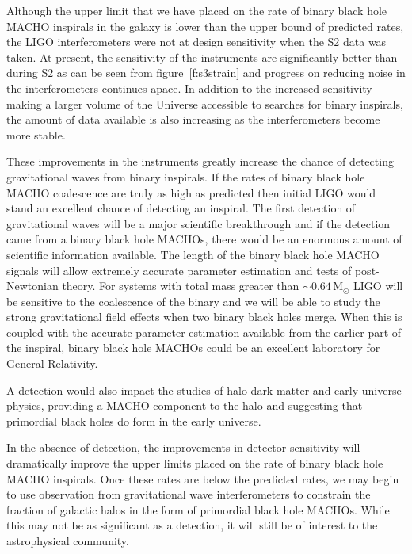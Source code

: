 
Although the upper limit that we have placed on the rate of binary black hole
MACHO inspirals in the galaxy is lower than the upper bound of predicted
rates, the LIGO interferometers were not at design sensitivity when the S2
data was taken. At present, the sensitivity of the instruments are
significantly better than during S2 as can be seen from figure~\ref{f:s3strain}
and progress on reducing noise in the interferometers continues apace.  In
addition to the increased sensitivity making a larger volume of the Universe
accessible to searches for binary inspirals, the amount of data available is
also increasing as the interferometers become more stable.

These improvements in the instruments greatly increase the chance of
detecting gravitational waves from binary inspirals. If the rates of binary
black hole MACHO coalescence are truly as high as predicted then initial LIGO
would stand an excellent chance of detecting an inspiral. The first detection
of gravitational waves will be a major scientific breakthrough and if the
detection came from a binary black hole MACHOs, there would be an enormous
amount of scientific information available. The length of the binary black
hole MACHO signals will allow extremely accurate parameter estimation and
tests of post-Newtonian theory. For systems with total mass greater than $\sim
0.64\,\mathrm{M}_\odot$ LIGO will be sensitive to the coalescence of the
binary and we will be able to study the strong gravitational field effects
when two binary black holes merge. When this is coupled with the accurate
parameter estimation available from the earlier part of the inspiral, binary
black hole MACHOs could be an excellent laboratory for General Relativity.

A detection would also impact the studies of halo dark matter and early
universe physics, providing a MACHO component to the halo and suggesting that
primordial black holes do form in the early universe.

In the absence of detection, the improvements in detector sensitivity will
dramatically improve the upper limits placed on the rate of binary black hole
MACHO inspirals. Once these rates are below the predicted rates, we may begin
to use observation from gravitational wave interferometers to constrain the
fraction of galactic halos in the form of primordial black hole MACHOs. While
this may not be as significant as a detection, it will still be of interest to
the astrophysical community.

